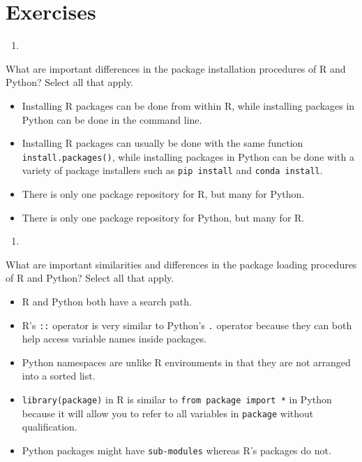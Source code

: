 \documentclass[
  12pt,
  krantz2]{krantz}
\providecommand{\tightlist}{%
  \setlength{\itemsep}{0pt}\setlength{\parskip}{0pt}}
\begin{document}
\hypertarget{exercises-8}{%
\section{Exercises}\label{exercises-8}}

\begin{enumerate}
\def\labelenumi{\arabic{enumi}.}
\tightlist
\item
\end{enumerate}

What are important differences in the package installation procedures of R and Python? Select all that apply.

\begin{itemize}
\tightlist
\item
  Installing R packages can be done from within R, while installing packages in Python can be done in the command line.
\item
  Installing R packages can usually be done with the same function \texttt{install.packages()}, while installing packages in Python can be done with a variety of package installers such as \texttt{pip\ install} and \texttt{conda\ install}.
\item
  There is only one package repository for R, but many for Python.
\item
  There is only one package repository for Python, but many for R.
\end{itemize}

\begin{enumerate}
\def\labelenumi{\arabic{enumi}.}
\setcounter{enumi}{1}
\tightlist
\item
\end{enumerate}

What are important similarities and differences in the package loading procedures of R and Python? Select all that apply.

\begin{itemize}
\tightlist
\item
  R and Python both have a search path.
\item
  R's \texttt{::} operator is very similar to Python's \texttt{.} operator because they can both help access variable names inside packages.
\item
  Python namespaces are unlike R environments in that they are not arranged into a sorted list.
\item
  \texttt{library(package)} in R is similar to \texttt{from\ package\ import\ *} in Python because it will allow you to refer to all variables in \texttt{package} without qualification.
\item
  Python packages might have \texttt{sub-modules} whereas R's packages do not.
\end{itemize}
\end{document}
